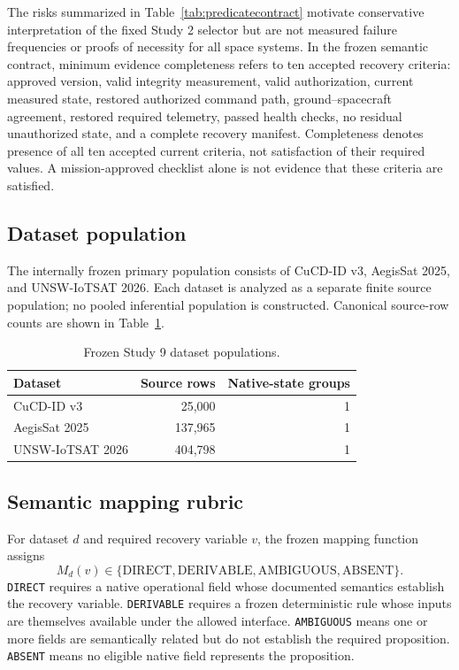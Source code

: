 \documentclass[preprint,12pt]{elsarticle}
\begin{document}
The risks summarized in Table~\ref{tab:predicatecontract} motivate conservative interpretation of the fixed Study 2 selector but are not measured failure frequencies or proofs of necessity for all space systems. In the frozen semantic contract, minimum evidence completeness refers to ten accepted recovery criteria: approved version, valid integrity measurement, valid authorization, current measured state, restored authorized command path, ground--spacecraft agreement, restored required telemetry, passed health checks, no residual unauthorized state, and a complete recovery manifest. Completeness denotes presence of all ten accepted current criteria, not satisfaction of their required values. A mission-approved checklist alone is not evidence that these criteria are satisfied.

\subsection{Dataset population}

The internally frozen primary population consists of CuCD-ID v3, AegisSat 2025, and UNSW-IoTSAT 2026. Each dataset is analyzed as a separate finite source population; no pooled inferential population is constructed. Canonical source-row counts are shown in Table~\ref{tab:datasets}.

\begin{table}[htbp]
\centering
\caption{Frozen Study 9 dataset populations.}
\label{tab:datasets}
\begin{tabular}{lrr}
\toprule
Dataset & Source rows & Native-state groups \\
\midrule
CuCD-ID v3 & 25,000 & 1 \\
AegisSat 2025 & 137,965 & 1 \\
UNSW-IoTSAT 2026 & 404,798 & 1 \\
\bottomrule
\end{tabular}
\end{table}

\subsection{Semantic mapping rubric}

For dataset $d$ and required recovery variable $v$, the frozen mapping function assigns
\begin{equation}
\label{eq:mapping}
M_d(v) \in \{\mathrm{DIRECT},\mathrm{DERIVABLE},\mathrm{AMBIGUOUS},\mathrm{ABSENT}\}.
\end{equation}
\texttt{DIRECT} requires a native operational field whose documented semantics establish the recovery variable. \texttt{DERIVABLE} requires a frozen deterministic rule whose inputs are themselves available under the allowed interface. \texttt{AMBIGUOUS} means one or more fields are semantically related but do not establish the required proposition. \texttt{ABSENT} means no eligible native field represents the proposition.
\end{document}
